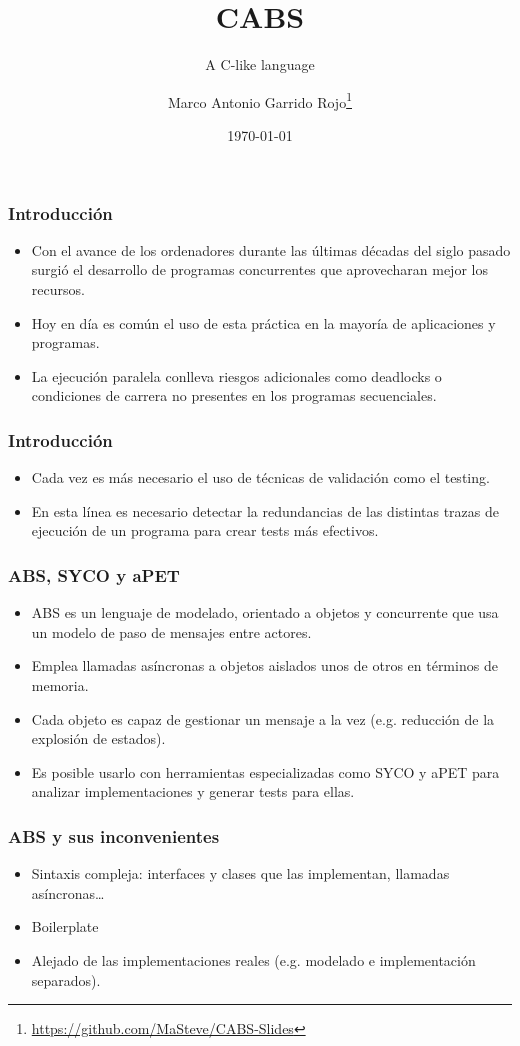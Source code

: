 \documentclass[spanish, a4paper, 12pt, final, slideColor, nototal, colorBG, pdf, noaccumulate, darkblue] {beamer}
\title{CABS}
\subtitle{A C-like language}
\author{Marco Antonio Garrido Rojo\thanks{\url{https://github.com/MaSteve/CABS-Slides}}}
\date{\today}
\begin{document}
\maketitle
\begin{frame}
  \frametitle{Introducción}
  \begin{itemize}
    \item Con el avance de los ordenadores durante las últimas décadas del siglo pasado surgió el desarrollo de programas concurrentes que aprovecharan mejor los recursos.
    \item Hoy en día es común el uso de esta práctica en la mayoría de aplicaciones y programas.
    \item La ejecución paralela conlleva riesgos adicionales como deadlocks o condiciones de carrera no presentes en los programas secuenciales.
  \end{itemize}
\end{frame}
\begin{frame}
  \frametitle{Introducción}
  \begin{itemize}
    \item Cada vez es más necesario el uso de técnicas de validación como el testing.
    \item En esta línea es necesario detectar la redundancias de las distintas trazas de ejecución de un programa para crear tests más efectivos.
  \end{itemize}
\end{frame}
\begin{frame}
  \frametitle{ABS, SYCO y aPET}
  \begin{itemize}
    \item ABS es un lenguaje de modelado, orientado a objetos y concurrente que usa un modelo de paso de mensajes entre actores.
    \item Emplea llamadas asíncronas a objetos aislados unos de otros en términos de memoria.
    \item Cada objeto es capaz de gestionar un mensaje a la vez (e.g. reducción de la explosión de estados).
    \item Es posible usarlo con herramientas especializadas como SYCO y aPET para analizar implementaciones y generar tests para ellas.
  \end{itemize}
\end{frame}
\begin{frame}
  \frametitle{ABS y sus inconvenientes}
  \begin{itemize}
    \item Sintaxis compleja: interfaces y clases que las implementan, llamadas asíncronas\dots
    \item Boilerplate
    \item Alejado de las implementaciones reales (e.g. modelado e implementación separados).
  \end{itemize}
\end{frame}
\end{document}
